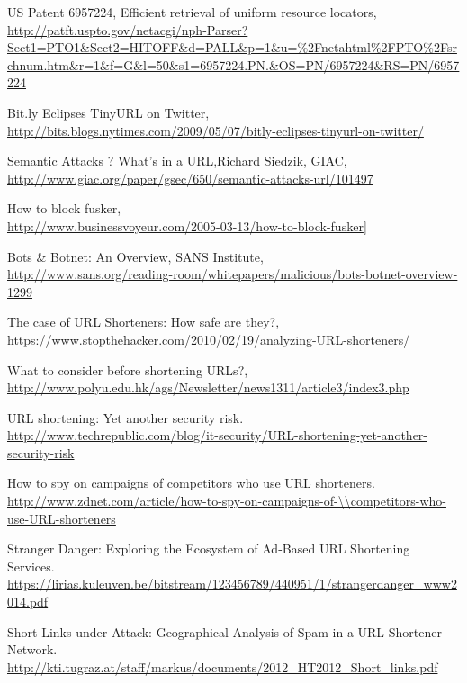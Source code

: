 \documentclass[12pt]{article}
\begin{document}
\begin{thebibliography}{99}

US Patent 6957224, Efficient retrieval of uniform resource locators, \\ \url{http://patft.uspto.gov/netacgi/nph-Parser?Sect1=PTO1&Sect2=HITOFF&d=PALL&p=1&u=%2Fnetahtml%2FPTO%2Fsrchnum.htm&r=1&f=G&l=50&s1=6957224.PN.&OS=PN/6957224&RS=PN/6957224}

Bit.ly Eclipses TinyURL on Twitter, \\ \url{http://bits.blogs.nytimes.com/2009/05/07/bitly-eclipses-tinyurl-on-twitter/}

Semantic Attacks ? What's in a URL,Richard Siedzik, GIAC, \\ \url{http://www.giac.org/paper/gsec/650/semantic-attacks-url/101497}

How to block fusker, \\ \url{http://www.businessvoyeur.com/2005-03-13/how-to-block-fusker}]

Bots \& Botnet: An Overview, SANS Institute, \\ \url{http://www.sans.org/reading-room/whitepapers/malicious/bots-botnet-overview-1299}

The case of URL Shorteners: How safe are they?, \\ \url{https://www.stopthehacker.com/2010/02/19/analyzing-URL-shorteners/}

What to consider before shortening URLs?, \\ \url{http://www.polyu.edu.hk/ags/Newsletter/news1311/article3/index3.php}

URL shortening: Yet another security risk. \\ \url{http://www.techrepublic.com/blog/it-security/URL-shortening-yet-another-security-risk}

How to spy on campaigns of competitors who use URL shorteners. \\ \url{http://www.zdnet.com/article/how-to-spy-on-campaigns-of-\\competitors-who-use-URL-shorteners}

Stranger Danger: Exploring the Ecosystem of Ad-Based URL Shortening Services. \\ \url{https://lirias.kuleuven.be/bitstream/123456789/440951/1/strangerdanger_www2014.pdf}

Short Links under Attack: Geographical Analysis of Spam in a URL Shortener Network. \\ \url {http://kti.tugraz.at/staff/markus/documents/2012_HT2012_Short_links.pdf}


\end{thebibliography}
\end{document}
